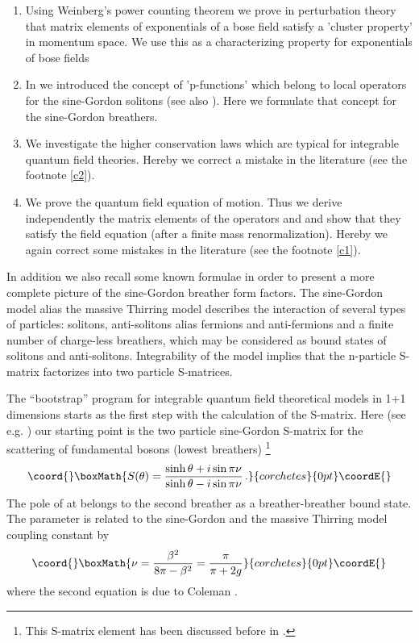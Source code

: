 \documentclass[a4paper,a4paper]{article}
\begin{document}
\begin{enumerate}
\item  Using Weinberg's power counting theorem we prove in perturbation
theory that matrix elements of exponentials of a bose field satisfy a
'cluster property' in momentum space. We use this as a characterizing
property for exponentials of bose fields

\item  In \cite{BK} we introduced the concept of 'p-functions' which belong
to local operators for the sine-Gordon solitons (see also \cite{Sm3,Ta}).
Here we formulate that concept for the sine-Gordon breathers.

\item  We investigate the higher conservation laws which are typical for
integrable quantum field theories. Hereby we correct a mistake in the
literature (see the footnote \ref{c2}).

\item  We prove the quantum field equation of motion. Thus we derive
independently the matrix elements of the operators \myHighlight{$\varphi $}\coordHE{} and \myHighlight{$:\!\sin
\beta \varphi \!:$}\coordHE{} and show that they satisfy the field equation (after a
finite mass renormalization). Hereby we again correct some mistakes in the
literature (see the footnote \ref{c1}).
\end{enumerate}

In addition we also recall some known formulae in order to present a more
complete picture of the sine-Gordon breather form factors. The sine-Gordon
model alias the massive Thirring model describes the interaction of several
types of particles: solitons, anti-solitons alias fermions and anti-fermions
and a finite number of charge-less breathers, which may be considered as
bound states of solitons and anti-solitons. Integrability of the model
implies that the n-particle S-matrix factorizes into two particle S-matrices.

The ``bootstrap'' program for integrable quantum field theoretical models in
1+1 dimensions starts as the first step with the calculation of the
S-matrix. Here (see e.g. \cite{KTTW,K2}) our starting point is the two
particle sine-Gordon S-matrix for the scattering of fundamental bosons
(lowest breathers) \cite{KT}\footnote{%
This S-matrix element has been discussed before in \cite{VG,AK}.} 
\[\coord{}\boxMath{
S(\theta )=\dfrac{\sinh \theta +i\sin \pi \nu }{\sinh \theta -i\sin \pi \nu }%
\,. 
}{corchetes}{0pt}\coordE{}\]
The pole of \coordHE{} at \coordHE{} belongs to the second
breather \coordHE{} as a breather-breather bound state. The parameter \myHighlight{$\nu $}\coordHE{} is
related to the sine-Gordon and the massive Thirring model coupling constant
by 
\[\coord{}\boxMath{
\nu =\frac{\beta ^{2}}{8\pi -\beta ^{2}}=\frac{\pi }{\pi +2g} 
}{corchetes}{0pt}\coordE{}\]
where the second equation is due to Coleman \cite{Co}.
\end{document}
